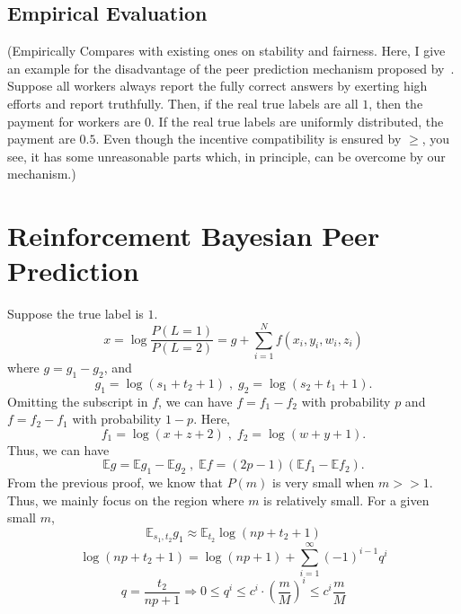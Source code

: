 \documentclass{article}
\begin{document}
\subsection{Empirical Evaluation}
(Empirically Compares with existing ones on stability and fairness. Here, I give an example for the disadvantage of the peer prediction mechanism proposed by~\cite{dasgupta2013crowdsourced}. Suppose all workers always report the fully correct answers by exerting high efforts and report truthfully. Then, if the real true labels are all $1$, then the payment for workers are $0$. If the real true labels are uniformly distributed, the payment are $0.5$. Even though the incentive compatibility is ensured by $\geq$, you see, it has some unreasonable parts which, in principle, can be overcome by our mechanism.)

\section{Reinforcement Bayesian Peer Prediction}
Suppose the true label is $1$.
\begin{equation}
x= \log\frac{P(L=1)}{P(L=2)}=g+\sum_{i=1}^{N}f(x_i,y_i,w_i,z_i)
\end{equation}
\noindent where $g=g_1-g_2$, and 
\begin{equation*}
g_1=\log(s_1+t_2+1)\;,\;g_2=\log(s_2+t_1+1).
\end{equation*}
Omitting the subscript in $f$, we can have $f=f_1-f_2$ with probability $p$ and $f=f_2-f_1$ with probability $1-p$. Here,
\begin{equation*}
f_1=\log(x+z+2)\;,\;f_2=\log(w+y+1).
\end{equation*}
Thus, we can have
\begin{equation}
\mathbb{E}g = \mathbb{E}g_1-\mathbb{E}g_2 \;,\;
\mathbb{E}f = (2p-1)(\mathbb{E}f_1-\mathbb{E}f_2).
\end{equation}
From the previous proof, we know that $P(m)$ is very small when $m>>1$. Thus, we mainly focus on the region where $m$ is relatively small. For a given small $m$,
\begin{equation}
\mathbb{E}_{s_1, t_2}g_1\approx \mathbb{E}_{t_2}\log(np+t_2+1)
\end{equation}
\begin{equation}
\log(np+t_2+1) = \log(np+1)+\sum_{i=1}^{\infty}(-1)^{i-1}q^i
\end{equation}
\begin{equation}
q = \frac{t_2}{np+1}\Rightarrow 0\leq q^{i} \leq c^{i}\cdot \left(\frac{m}{M}\right)^i\leq c^{i}\frac{m}{M}
\end{equation}
\end{document}
